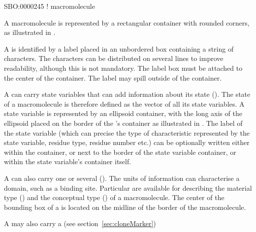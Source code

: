 \begin{glyphDescription}

\glyphSboTerm SBO:0000245 ! macromolecule 

\glyphContainer A macromolecule is represented by a rectangular container with rounded corners, as illustrated in .

\glyphLabel A  is identified by a label placed in an unbordered box containing a string of characters.  The characters can be distributed on several lines to improve readability, although this is not mandatory.  The label box must be attached to the center of the container.  The label may spill outside of the container.

\glyphAux A  can carry state variables that can add information about its state ().  The state of a macromolecule is therefore defined as the vector of all its state variables.  A state variable is represented by an ellipsoid container, with the long axis of the ellipsoid placed on the border of the 's container as illustrated in .  The label of the state variable (which can precise the type of characteristic represented by the state variable, residue type, residue number etc.) can be optionally written either within the  container, or next to the border of the state variable container, or within the state variable's container itself.

A  can also carry one or several  ().  The units of information can characterise a domain, such as a binding site.  Particular  are available for describing the material type () and the conceptual type () of a macromolecule.  The center of the bounding box of a  is located on the midline of the border of the macromolecule.

A  may also carry a  (see section~\ref{sec:cloneMarker})

\end{glyphDescription}

